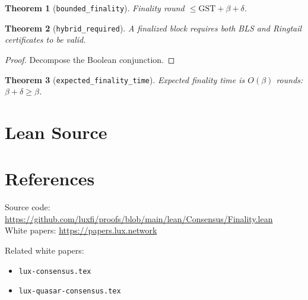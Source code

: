 \documentclass[11pt]{article}
\newtheorem{theorem}{Theorem}
\begin{document}
\begin{theorem}[\texttt{bounded\_finality}]
Finality round $\leq \text{GST} + \beta + \delta$.
\end{theorem}

\begin{theorem}[\texttt{hybrid\_required}]
A finalized block requires both BLS and Ringtail certificates to be valid.
\end{theorem}
\begin{proof}
Decompose the Boolean conjunction.
\end{proof}

\begin{theorem}[\texttt{expected\_finality\_time}]
Expected finality time is $O(\beta)$ rounds: $\beta + \delta \geq \beta$.
\end{theorem}


\section{Lean Source}


\section{References}
\noindent Source code: \url{https://github.com/luxfi/proofs/blob/main/lean/Consensus/Finality.lean}\\
\noindent White papers: \url{https://papers.lux.network}

\noindent Related white papers:
\begin{itemize}
  \item \texttt{lux-consensus.tex}
  \item \texttt{lux-quasar-consensus.tex}
\end{itemize}
\end{document}
